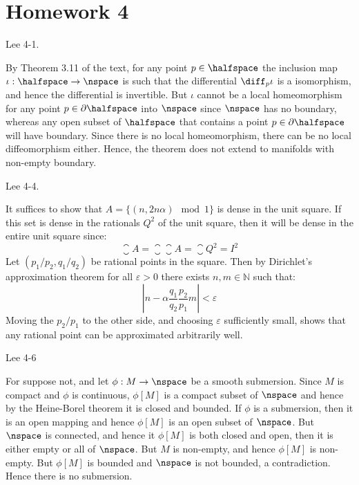 \section{Homework 4}
    \begin{problem}
        Lee 4-1.
    \end{problem}
    \begin{solution}
        By Theorem 3.11 of the text, for any point $p\in\halfspace$ the
        inclusion map $\iota:\halfspace\rightarrow\nspace$ is such that the
        differential $\diff_{p}\iota$ is a isomorphism, and hence the
        differential is invertible. But $\iota$ cannot be a local
        homeomorphism for any point $p\in\partial\halfspace$ into
        $\nspace$ since $\nspace$ has no boundary, whereas any open subset
        of $\halfspace$ that contains a point $p\in\partial\halfspace$ will
        have boundary. Since there is no local homeomorphism, there can be
        no local diffeomorphism either. Hence, the theorem does not extend 
        to manifolds with non-empty boundary.
    \end{solution}
    \begin{problem}
        Lee 4-4.
    \end{problem}
    \begin{solution}
        It suffices to show that $A=\{(n,2n\alpha)\mod{1}\}$ is dense in the
        unit square. If this set is dense in the rationals $Q^{2}$ of the
        unit square, then it will be dense in the entire unit square since:
        \begin{equation}
            \closure{A}=\closure{\closure{A}}=\closure{Q^{2}}=I^{2}
        \end{equation}
        Let $(p_{1}/p_{2},q_{1}/q_{2})$ be rational points in the square.
        Then by Dirichlet's approximation theorem for all $\varepsilon>0$
        there exists $n,m\in\mathbb{N}$ such that:
        \begin{equation}
            |n-\alpha\frac{q_{1}}{q_{2}}\frac{p_{2}}{p_{1}}m|<\varepsilon
        \end{equation}
        Moving the $p_{2}/p_{1}$ to the other side, and choosing
        $\varepsilon$ sufficiently small, shows that any rational point can
        be approximated arbitrarily well.
    \end{solution}
    \begin{problem}
        Lee 4-6
    \end{problem}
    \begin{solution}
        For suppose not, and let $\phi:M\rightarrow\nspace$ be a smooth
        submersion. Since $M$ is compact and $\phi$ is continuous,
        $\phi[M]$ is a compact subset of $\nspace$ and hence by the
        Heine-Borel theorem it is closed and bounded. If $\phi$ is a
        submersion, then it is an open mapping and hence $\phi[M]$ is an
        open subset of $\nspace$. But $\nspace$ is connected, and hence it
        $\phi[M]$ is both closed and open, then it is either empty or all of
        $\nspace$. But $M$ is non-empty, and hence $\phi[M]$ is non-empty.
        But $\phi[M]$ is bounded and $\nspace$ is not bounded, a
        contradiction. Hence there is no submersion.
    \end{solution}
